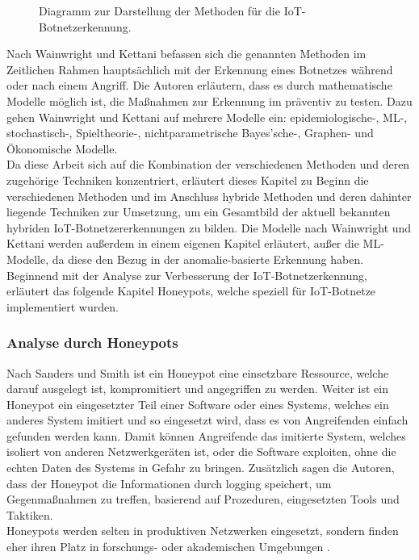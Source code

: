 \begin{figure}[ht]
    \centering
    
    \caption{Diagramm zur Darstellung der Methoden für die IoT-Botnetzerkennung.}
    \label{fig:det_meth_diag}
\end{figure}

Nach Wainwright und Kettani \cite{DBLP:conf/iccda/WainwrightK19} befassen sich die genannten Methoden im Zeitlichen Rahmen hauptsächlich mit der Erkennung eines Botnetzes während oder nach einem Angriff. Die Autoren erläutern, dass es durch mathematische Modelle möglich ist, die Maßnahmen zur Erkennung im präventiv zu testen. Dazu gehen Wainwright und Kettani auf mehrere Modelle ein: epidemiologische-, ML-, stochastisch-, Spieltheorie-, nichtparametrische Bayes'sche-, Graphen- und Ökonomische Modelle. \\[0.2in]

Da diese Arbeit sich auf die Kombination der verschiedenen Methoden und deren zugehörige Techniken konzentriert, erläutert dieses Kapitel zu Beginn die verschiedenen Methoden und im Anschluss  hybride Methoden und deren dahinter liegende Techniken zur Umsetzung, um ein Gesamtbild der aktuell bekannten hybriden IoT-Botnetzererkennungen zu bilden. Die Modelle nach Wainwright und Kettani werden außerdem in einem eigenen Kapitel erläutert, außer die ML-Modelle, da diese den Bezug in der anomalie-basierte Erkennung haben. \\ 
Beginnend mit der Analyse zur Verbesserung der IoT-Botnetzerkennung, erläutert das folgende Kapitel Honeypots, welche speziell für IoT-Botnetze implementiert wurden.

\subsubsection{Analyse durch Honeypots}

Nach Sanders und Smith  \cite{SANDERS2014317} ist ein Honeypot eine einsetzbare Ressource, welche darauf ausgelegt ist, kompromitiert und angegriffen zu werden. Weiter ist ein Honeypot ein eingesetzter Teil einer Software oder eines Systems, welches ein anderes System imitiert und so eingesetzt wird, dass es von Angreifenden einfach gefunden werden kann. Damit können Angreifende das imitierte System, welches isoliert von anderen Netzwerkgeräten ist, oder die Software exploiten, ohne die echten Daten des Systems in Gefahr zu bringen. Zusätzlich sagen die Autoren, dass der Honeypot die Informationen durch logging speichert, um Gegenmaßnahmen zu treffen, basierend auf Prozeduren, eingesetzten Tools und Taktiken. \\ Honeypots werden selten in produktiven Netzwerken eingesetzt, sondern finden eher ihren Platz in forschungs- oder akademischen Umgebungen . \\[0.2in]


